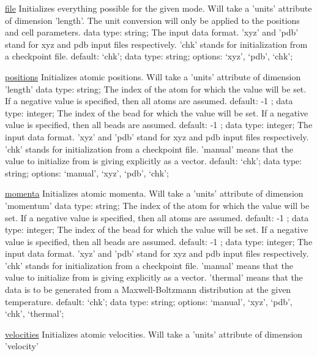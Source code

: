 \begin{ipifield}{}
\begin{ipifield}{\hyperref[INITFILE]{file}}
{Initializes everything possible for the given mode. Will take a 'units' attribute of dimension 'length'. The unit conversion will only be applied to the positions and cell parameters.}%
{data type: string; }%
{%
{The input data format. 'xyz' and 'pdb' stand for xyz and pdb input files respectively. 'chk' stands for initialization from a checkpoint file.}%
{default: `chk'; data type: string; options: `xyz', `pdb', `chk'; }%
}
\end{ipifield}
\begin{ipifield}{\hyperref[INITPOSITIONS]{positions}}%
{Initializes atomic positions. Will take a 'units' attribute of dimension 'length'}%
{data type: string; }%
{%
{The index of the atom for which the value will be set. If a negative value is specified, then all atoms are assumed.}%
{default:  -1 ; data type: integer; }%
%
{The index of the bead for which the value will be set. If a negative value is specified, then all beads are assumed.}%
{default:  -1 ; data type: integer; }%
%
{The input data format. 'xyz' and 'pdb' stand for xyz and pdb input files respectively. 'chk' stands for initialization from a checkpoint file. 'manual' means that the value to initialize from is giving explicitly as a vector.}%
{default: `chk'; data type: string; options: `manual', `xyz', `pdb', `chk'; }%
}
\end{ipifield}
\begin{ipifield}{\hyperref[INITMOMENTA]{momenta}}%
{Initializes atomic momenta. Will take a 'units' attribute of dimension 'momentum'}%
{data type: string; }%
{%
{The index of the atom for which the value will be set. If a negative value is specified, then all atoms are assumed.}%
{default:  -1 ; data type: integer; }%
%
{The index of the bead for which the value will be set. If a negative value is specified, then all beads are assumed.}%
{default:  -1 ; data type: integer; }%
%
{The input data format. 'xyz' and 'pdb' stand for xyz and pdb input files respectively. 'chk' stands for initialization from a checkpoint file. 'manual' means that the value to initialize from is giving explicitly as a vector. 'thermal' means that the data is to be generated from a Maxwell-Boltzmann distribution at the given temperature.}%
{default: `chk'; data type: string; options: `manual', `xyz', `pdb', `chk', `thermal'; }%
}
\end{ipifield}
\begin{ipifield}{\hyperref[INITVELOCITIES]{velocities}}%
{Initializes atomic velocities. Will take a 'units' attribute of dimension 'velocity'}%

\end{ipifield}
\end{ipifield}
